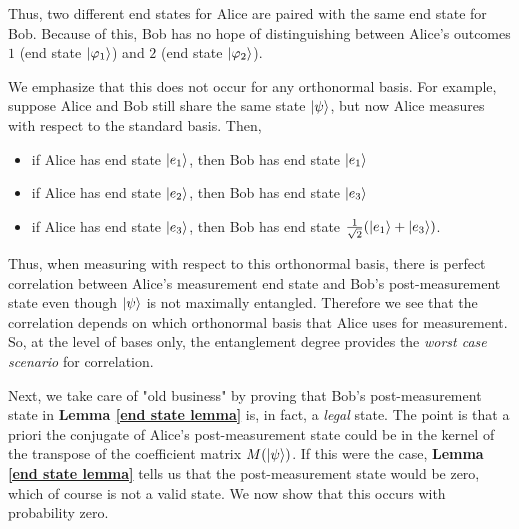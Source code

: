 \begin{example}
Thus, two different end states for Alice are paired with the same end state for Bob.  Because of this, Bob has no hope of distinguishing between Alice's outcomes $1$ (end state $\ket{\varphi_1}$) and $2$ (end state $\ket{\varphi_2}$).
\end{example} 
We emphasize that this does not occur for any orthonormal basis. For example, suppose Alice and Bob still share the same state $\ket{\psi}$, but now Alice measures with respect to the standard basis.  Then,

\begin{itemize}
\item if Alice has end state $\ket{e_1}$, then Bob has end state $\ket{e_1}$
\item if Alice has end state $\ket{e_2}$, then Bob has end state $\ket{e_3}$
\item if Alice has end state $\ket{e_3}$, then Bob has end state  $\frac{1}{\sqrt{2}}(\ket{e_1}+\ket{e_3})$.
\end{itemize}
Thus, when measuring with respect to this orthonormal basis, there is perfect correlation between Alice's measurement end state and Bob's post-measurement state even though $\ket{\psi}$ is not maximally entangled.  Therefore we see that the correlation depends on which orthonormal basis that Alice uses for measurement. So, at the level of bases only, the entanglement degree provides the \textit{worst case scenario} for correlation.











Next, we take care of "old business" by proving that Bob's post-measurement state in \textbf{Lemma \ref{end state lemma}} is, in fact, a {\emph{legal}} state.  The point is that a priori the conjugate of Alice's post-measurement state could be in the kernel of the transpose of the coefficient matrix $M(\ket{\psi})$. If this were the case, {\bf{Lemma} \ref{end state lemma}} tells us that the post-measurement state would be zero, which of course is not a valid state.  We now show that this occurs with probability zero.

